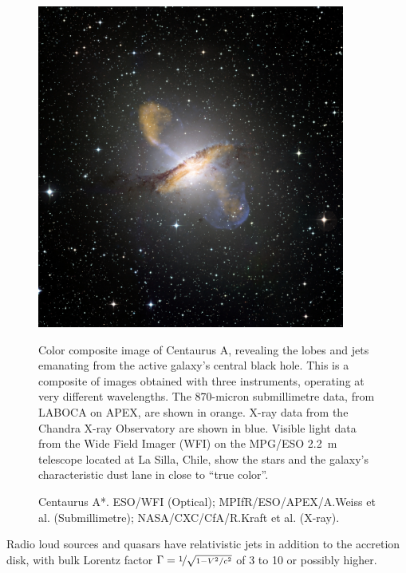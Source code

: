 \documentclass[10pt,a4paper,english]{article}
\begin{document}
\begin{figure}[!ht]
    \noindent
    \begin{minipage}{.6\textwidth}
        \centering
        \includegraphics[width=0.9\textwidth]{eso0903a.jpg}
    \end{minipage}%
    \hfill
    \begin{minipage}{.4\textwidth}
        Color composite image of Centaurus A, revealing the lobes and jets
        emanating from the active galaxy’s central black hole. This is a
        composite of images obtained with three instruments, operating at very
        different wavelengths. The 870-micron submillimetre data, from LABOCA
        on APEX, are shown in orange. X-ray data from the Chandra X-ray
        Observatory are shown in blue. Visible light data from the Wide Field
        Imager (WFI) on the MPG/ESO \SI{2.2}{\m} telescope located at La Silla, Chile,
        show the stars and the galaxy’s characteristic dust lane in close to
        “true color”.
    \end{minipage}
    \caption{
        Centaurus A*. ESO/WFI (Optical); MPIfR/ESO/APEX/A.Weiss et al.
        (Submillimetre); NASA/CXC/CfA/R.Kraft et al. (X-ray).
    }
\end{figure}

Radio loud sources and quasars have relativistic jets in addition to the
accretion disk, with bulk Lorentz factor $\Gamma=\nicefrac{1}{\sqrt{1-V^2/c^2}}$
of 3 to 10 or possibly higher.
\end{document}
